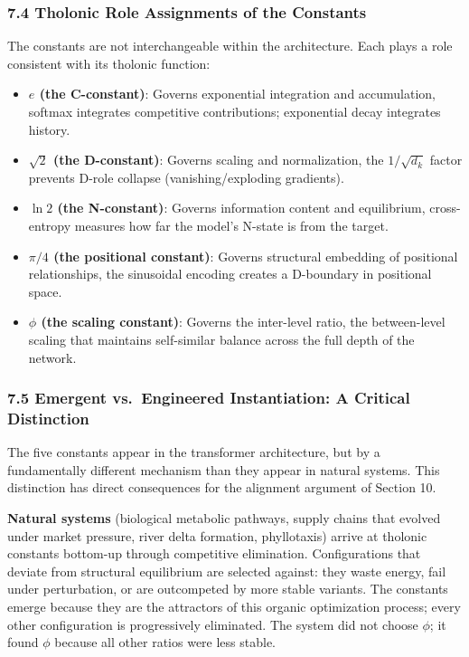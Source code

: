 \documentclass[
  11pt,
  letterpaper,
]{article}
\providecommand{\tightlist}{%
  \setlength{\itemsep}{0pt}\setlength{\parskip}{0pt}}
\begin{document}
\subsubsection{7.4 Tholonic Role Assignments of the
Constants}\label{tholonic-role-assignments-of-the-constants}

The constants are not interchangeable within the architecture. Each
plays a role consistent with its tholonic function:

\begin{itemize}
\tightlist
\item
  \textbf{\(e\) (the C-constant)}: Governs exponential integration and
  accumulation, softmax integrates competitive contributions;
  exponential decay integrates history.
\item
  \textbf{\(\sqrt{2}\) (the D-constant)}: Governs scaling and
  normalization, the \(1/\sqrt{d_k}\) factor prevents D-role collapse
  (vanishing/exploding gradients).
\item
  \textbf{\(\ln 2\) (the N-constant)}: Governs information content and
  equilibrium, cross-entropy measures how far the model's N-state is
  from the target.
\item
  \textbf{\(\pi/4\) (the positional constant)}: Governs structural
  embedding of positional relationships, the sinusoidal encoding creates
  a D-boundary in positional space.
\item
  \textbf{\(\phi\) (the scaling constant)}: Governs the inter-level
  ratio, the between-level scaling that maintains self-similar balance
  across the full depth of the network.
\end{itemize}

\subsubsection{7.5 Emergent vs.~Engineered Instantiation: A Critical
Distinction}\label{emergent-vs.-engineered-instantiation-a-critical-distinction}

The five constants appear in the transformer architecture, but by a
fundamentally different mechanism than they appear in natural systems.
This distinction has direct consequences for the alignment argument of
Section 10.

\textbf{Natural systems} (biological metabolic pathways, supply chains
that evolved under market pressure, river delta formation, phyllotaxis)
arrive at tholonic constants bottom-up through competitive elimination.
Configurations that deviate from structural equilibrium are selected
against: they waste energy, fail under perturbation, or are outcompeted
by more stable variants. The constants emerge because they are the
attractors of this organic optimization process; every other
configuration is progressively eliminated. The system did not choose
\(\phi\); it found \(\phi\) because all other ratios were less stable.
\end{document}
